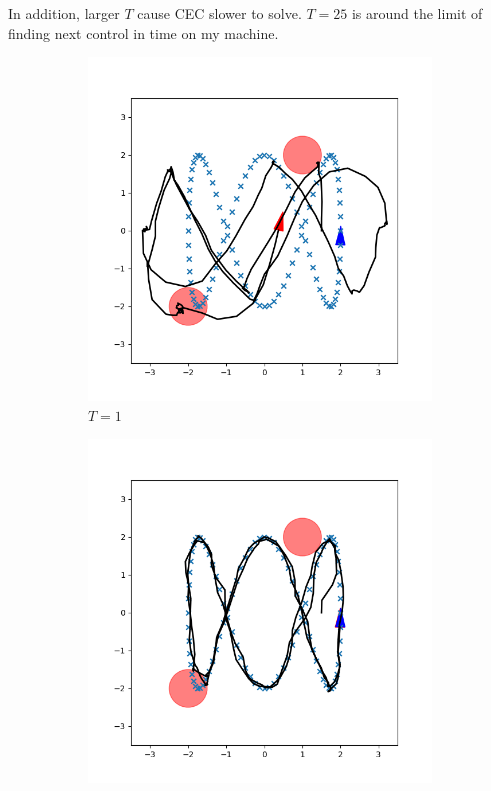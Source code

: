 \documentclass[conference]{IEEEtran}
\begin{document}
In addition, larger $T$ cause CEC slower to solve. 
$T=25$ is around the limit of finding next control in time on my machine.

\begin{figure}[h]
    \centering
    \begin{subfigure}[b]{0.3\textwidth}
        \includegraphics[width=\textwidth]{../fig/trajectory.cec.T_1.png}
        \caption{$T=1$}
        \label{fig:T1}
    \end{subfigure}
    \hfill
    \begin{subfigure}[b]{0.3\textwidth}
        \includegraphics[width=\textwidth]{../fig/trajectory.cec.png}

\end{subfigure}
\end{figure}
\end{document}
